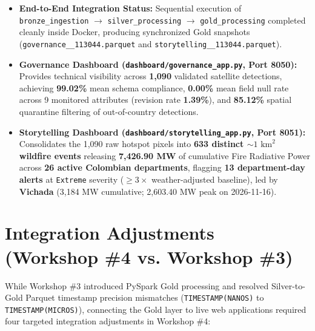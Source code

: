 \documentclass[11pt,a4paper]{article}
\begin{document}
\begin{itemize}[leftmargin=1.4em, itemsep=3pt]
    \item \textbf{End-to-End Integration Status:} Sequential execution of \texttt{bronze\_ingestion} $\rightarrow$ \texttt{silver\_processing} $\rightarrow$ \texttt{gold\_processing} completed cleanly inside Docker, producing synchronized Gold snapshots (\texttt{governance\_\_\allowbreak 113044.parquet} and \texttt{storytelling\_\_\allowbreak 113044.parquet}).
    \item \textbf{Governance Dashboard (\texttt{dashboard/governance\_app.py}, Port 8050):} Provides technical visibility across \textbf{1,090} validated satellite detections, achieving \textbf{99.02\%} mean schema compliance, \textbf{0.00\%} mean field null rate across 9 monitored attributes (revision rate \textbf{1.39\%}), and \textbf{85.12\%} spatial quarantine filtering of out-of-country detections.
    \item \textbf{Storytelling Dashboard (\texttt{dashboard/storytelling\_app.py}, Port 8051):} Consolidates the 1,090 raw hotspot pixels into \textbf{633 distinct $\sim 1\text{ km}^2$ wildfire events} releasing \textbf{7,426.90 MW} of cumulative Fire Radiative Power across \textbf{26 active Colombian departments}, flagging \textbf{13 department-day alerts} at \texttt{Extreme} severity ($\ge 3\times$ weather-adjusted baseline), led by \textbf{Vichada} (3,184 MW cumulative; 2,603.40 MW peak on 2026-11-16).
\end{itemize}

\section{Integration Adjustments (Workshop \#4 vs. Workshop \#3)}

While Workshop \#3 introduced PySpark Gold processing and resolved Silver-to-Gold Parquet timestamp precision mismatches (\texttt{TIMESTAMP(NANOS)} to \texttt{TIMESTAMP(MICROS)}), connecting the Gold layer to live web applications required four targeted integration adjustments in Workshop \#4:
\end{document}
